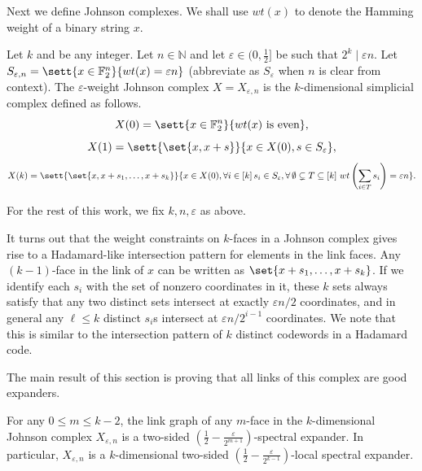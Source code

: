 Next we define Johnson complexes. We shall use $wt(x)$ to denote the Hamming weight of a binary string $x$.
\begin{definition}\label{def:Johnson-complex}
Let \(k\) and  be any integer. Let \(n\in\mathbb{N}\) and let \(\varepsilon \in (0,\frac{1}{2}]\) be such that \(2^k \; | \; \varepsilon n\). Let \(S_{\varepsilon,n}  = \sett{x \in \mathbb{F}_2^n}{wt(x) = \varepsilon n}\) (abbreviate as \(S_{\varepsilon}\) when \(n\) is clear from context). The \(\varepsilon\)-weight Johnson complex \(X = X_{\varepsilon,n}\) is the \(k\)-dimensional simplicial complex defined as follows.
\[X(0) = \sett{x \in \mathbb{F}_2^n}{ wt(x) \text{ is even}},\]
\[X(1) = \sett{\set{x,x+s}}{x \in X(0), s \in S_{\varepsilon}},\]
\[X(k) = \sett{\set{x,x+ s_1,\dots,x+ s_k}}{x \in X(0),\forall i\in[k]\,s_i\in S_{\varepsilon}, \forall\,\emptyset\subsetneq T \subseteq [k]~wt\left(\sum_{i \in T}s_i\right) = \varepsilon n}.\]
\end{definition}
For the rest of this work, we fix \(k,n,\varepsilon\) as above.

It turns out that the weight constraints on $k$-faces in a Johnson complex gives rise to a Hadamard-like intersection pattern for elements in the link faces. Any $(k-1)$-face in the link of $x$ can be written as $\set{x+s_1,\dots,x+s_k}$. If we identify each $s_i$ with the set of nonzero coordinates in it, these $k$ sets always satisfy that any two distinct sets intersect at exactly $\varepsilon n/2$ coordinates, and in general any $\ell \le k$ distinct $s_i$s intersect at $\varepsilon n/2^{i-1}$ coordinates. We note that this is similar to the intersection pattern of $k$ distinct codewords in a Hadamard code. 




The main result of this section is proving that all links of this complex are good expanders.
\begin{lemma}\label{lem:Johnson-complex-spectral-expansion}
    For any $0\le m \le k-2$, the link graph of any $m$-face in the $k$-dimensional Johnson complex $X_{\varepsilon,n}$ is a two-sided $ \left(\frac{1}{2}-\frac{\varepsilon}{2^{m+1}}\right)$-spectral expander. In particular,  $X_{\varepsilon,n}$ is a $k$-dimensional two-sided $\left(\frac{1}{2}-\frac{\varepsilon}{2^{k-1}}\right)$-local spectral expander. 
\end{lemma}


